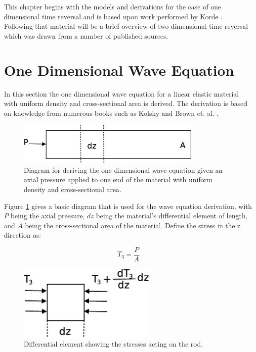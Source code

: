 This chapter begins with the models and derivations for the case of one dimensional time reversal and is based upon work performed by Korde \cite{Fehrman2012}. Following that material will be a brief overview of two dimensional time reversal which was drawn from a number of published sources.

\section{One Dimensional Wave Equation}
\label{sec:oneDWaveEquation}

In this section the one dimensional wave equation for a linear elastic material with uniform density and cross-sectional area is derived. The derivation is based on knowledge from numerous books such as Kolsky \cite{Kolsky1963} and Brown et. al. \cite{Brown2008}.

\begin{figure}[ht!]
\centering
\includegraphics[width=0.8\textwidth]{eps_pics/deriveWaveRod}
\caption{Diagram for deriving the one dimensional wave equation given an axial pressure applied to one end of the material with uniform density and cross-sectional area.
	 \label{fig:deriveWaveRod}} 
\end{figure}

Figure \ref{fig:deriveWaveRod} gives a basic diagram that is used for the wave equation derivation, with $P$ being the axial pressure, $dz$ being the material's differential element of length, and $A$ being the cross-sectional area of the material. Define the stress in the z direction as:

\begin{equation}
T_3 = \frac{P}{A}
\end{equation}


\begin{figure}[ht!]
\centering
\includegraphics[width=0.6\textwidth]{eps_pics/diffElementRod}
\caption{Differential element showing the stresses acting on the rod.
	 \label{fig:diffElementRod}} 
\end{figure}

